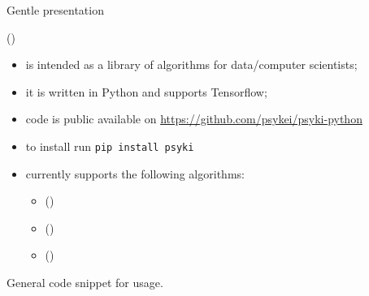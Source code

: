 \documentclass[presentation]{beamer}\mode<presentation>{\usetheme{AMSBolognaFC}}
\begin{document}
\begin{frame}[allowframebreaks]{Gentle presentation}
    \begin{block}{\longpsyki{} (\psyki) }
        \begin{itemize}
            \item \psyki is intended as a library of \ski{} algorithms for data/computer scientists;
            \item it is written in Python and supports Tensorflow;
            \item code is public available on \href{https://github.com/psykei/psyki-python}{https://github.com/psykei/psyki-python}
            \item to install run \texttt{pip install psyki}
            \item currently \psyki{} supports the following \ski{} algorithms:
            \begin{itemize}
                \item \longkins{} (\kins) 
                \item \longkill{} (\shortkill) 
                \item \longkbann{} (\kbann) 
            \end{itemize}
        \end{itemize}
    \end{block}

    \framebreak
    
    General code snippet for \psyki{} usage.
    
    
\end{frame}
\end{document}
